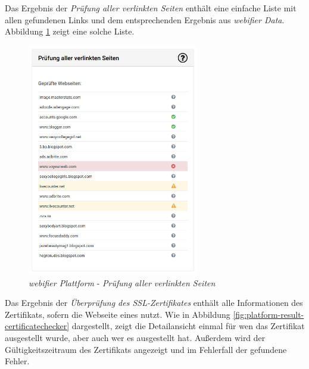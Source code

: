 Das Ergebnis der \textit{Prüfung aller verlinkten Seiten} enthält eine einfache Liste mit allen
gefundenen Links und dem entsprechenden Ergebnis aus \textit{webifier Data}. Abbildung
\ref{fig:platform-result-linkchecker} zeigt eine solche Liste.

\begin{figure}[H]
  \centering
  \includegraphics[width=7.5cm]{images/platform/linkchecker-undefined}
  \caption{\textit{webifier Plattform} - \textit{Prüfung aller verlinkten Seiten}}
  \label{fig:platform-result-linkchecker}
\end{figure}

\newpage

Das Ergebnis der \textit{Überprüfung des SSL-Zertifikates} enthält alle Informationen des
Zertifikats, sofern die Webseite eines nutzt. Wie in Abbildung
\ref{fig:platform-result-certificatechecker} dargestellt, zeigt die Detailansicht einmal für wen
das Zertifikat ausgestellt wurde, aber auch wer es ausgestellt hat. Außerdem wird der
Gültigkeitszeitraum des Zertifikats angezeigt und im Fehlerfall der gefundene Fehler.


